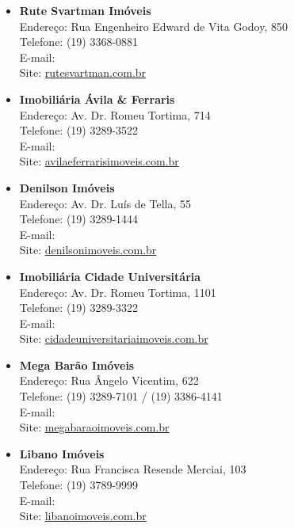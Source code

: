 \begin{itemize}
    \item   \textbf{Rute Svartman Imóveis}
        \\Endereço: Rua Engenheiro Edward de Vita Godoy, 850
        \\Telefone: (19) 3368-0881
        \\E-mail: 
        \\Site: \url{rutesvartman.com.br}

    \item   \textbf{Imobiliária Ávila \& Ferraris}
        \\Endereço: Av. Dr. Romeu Tortima, 714
        \\Telefone: (19) 3289-3522
        \\E-mail: 
        \\Site: \url{avilaeferrarisimoveis.com.br}

    \item   \textbf{Denilson Imóveis}
        \\Endereço: Av. Dr. Luís de Tella, 55
        \\Telefone: (19) 3289-1444
        \\E-mail: 
        \\Site: \url{denilsonimoveis.com.br}

    \item   \textbf{Imobiliária Cidade Universitária}
        \\Endereço: Av. Dr. Romeu Tortima, 1101
        \\Telefone: (19) 3289-3322
        \\E-mail: 
        \\Site: \url{cidadeuniversitariaimoveis.com.br}

    \item   \textbf{Mega Barão Imóveis}
        \\Endereço: Rua Ângelo Vicentim, 622
        \\Telefone: (19) 3289-7101 / (19) 3386-4141
        \\E-mail: 
        \\Site: \url{megabaraoimoveis.com.br}

    \item   \textbf{Libano Imóveis}
        \\Endereço: Rua Francisca Resende Merciai, 103
        \\Telefone: (19) 3789-9999
        \\E-mail: 
        \\Site: \url{libanoimoveis.com.br}


\end{itemize}
